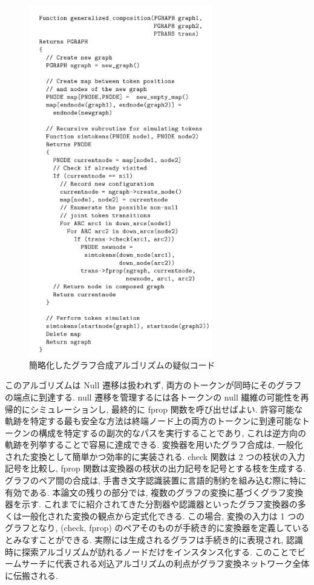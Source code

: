 \documentclass[twocolumn]{jarticle}     %
\begin{document}
\begin{figure}[t]
  \centering
  \includegraphics[width=80mm]{assets/29.png}
  \caption{簡略化したグラフ合成アルゴリズムの疑似コード}
  \label{fig:29}
\end{figure}
このアルゴリズムは Null 遷移は扱われず, 両方のトークンが同時にそのグラフの端点に到達する. null 遷移を管理するには各トークンの null 繊維の可能性を再帰的にシミュレーションし, 最終的に fprop 関数を呼び出せばよい. 許容可能な軌跡を特定する最も安全な方法は終端ノード上の両方のトークンに到達可能なトークンの構成を特定するの副次的なパスを実行することであり, これは逆方向の軌跡を列挙することで容易に達成できる. 
変換器を用いたグラフ合成は, 一般化された変換として簡単かつ効率的に実装される. check 関数は 2 つの枝状の入力記号を比較し, fprop 関数は変換器の枝状の出力記号を記号とする枝を生成する. 
グラフのペア間の合成は, 手書き文字認識装置に言語的制約を組み込む際に特に有効である. 
本論文の残りの部分では, 複数のグラフの変換に基づくグラフ変換器を示す. これまでに紹介されてきた分割器や認識器といったグラフ変換器の多くは一般化された変換の観点から定式化できる. 
この場合, 変換の入力は 1 つのグラフとなり, (check, fprop) のペアそのものが手続き的に変換器を定義しているとみなすことができる. 実際には生成されるグラフは手続き的に表現され, 認識時に探索アルゴリズムが訪れるノードだけをインスタンス化する. このことでビームサーチに代表される刈込アルゴリズムの利点がグラフ変換ネットワーク全体に伝搬される.
\end{document}
